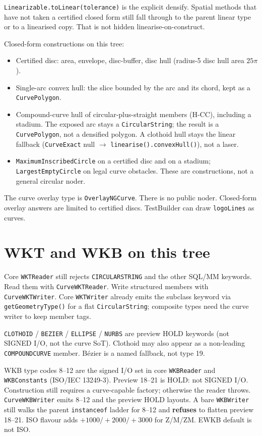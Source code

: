 \documentclass[11pt]{article}
\begin{document}
\texttt{Linearizable.toLinear(tolerance)} is the explicit densify.
Spatial methods that have not taken a certified closed form still
fall through to the parent linear type or to a linearised copy. That
is not hidden linearise-on-construct.

Closed-form constructions on this tree:
\begin{itemize}
  \item Certified disc: area, envelope, disc-buffer, disc hull
        (radius-5 disc hull area $25\pi$).
  \item Single-arc convex hull: the slice bounded by the arc and its
        chord, kept as a \texttt{CurvePolygon}.
  \item Compound-curve hull of circular-plus-straight members
        (H-CC), including a stadium. The exposed arc stays a
        \texttt{CircularString}; the result is a
        \texttt{CurvePolygon}, not a densified polygon. A clothoid
        hull stays the linear fallback
        (\texttt{CurveExact} null $\rightarrow$
        \texttt{linearise().convexHull()}), not a laser.
  \item \texttt{MaximumInscribedCircle} on a certified disc and on a
        stadium; \texttt{LargestEmptyCircle} on legal curve
        obstacles. These are constructions, not a general circular
        noder.
\end{itemize}

The curve overlay type is \texttt{OverlayNGCurve}. There is no public
noder. Closed-form overlay answers are limited to certified discs.
TestBuilder can draw \texttt{logoLines} as curves.

\section{WKT and WKB on this tree}
Core \texttt{WKTReader} still rejects \texttt{CIRCULARSTRING} and the
other SQL/MM keywords. Read them with \texttt{CurveWKTReader}. Write
structured members with \texttt{CurveWKTWriter}. Core
\texttt{WKTWriter} already emits the subclass keyword via
\texttt{getGeometryType()} for a flat \texttt{CircularString};
composite types need the curve writer to keep member tags.

\texttt{CLOTHOID} / \texttt{BEZIER} / \texttt{ELLIPSE} / \texttt{NURBS}
are preview HOLD keywords (not SIGNED I/O, not the curve SoT).
Clothoid may also appear as a non-leading \texttt{COMPOUNDCURVE}
member. B\'ezier is a named fallback, not type 19.

WKB type codes 8--12 are the signed I/O set in core
\texttt{WKBReader} and \texttt{WKBConstants} (ISO/IEC 13249-3).
Preview 18--21 is HOLD: not SIGNED I/O. Construction still
requires a curve-capable factory; otherwise the reader throws.
\texttt{CurveWKBWriter} emits 8--12 and the preview HOLD layouts. A
bare \texttt{WKBWriter} still walks the parent \texttt{instanceof}
ladder for 8--12 and \textbf{refuses} to flatten preview 18--21.
ISO flavour adds $+1000/+2000/+3000$ for Z/M/ZM. EWKB default is
not ISO.
\end{document}
